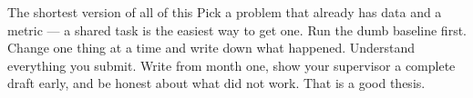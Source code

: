 \documentclass[11pt,a4paper]{article}
\begin{document}
\vspace{0.5cm}
\begin{cbox}{The shortest version of all of this}
Pick a problem that already has data and a metric --- a shared task is the
easiest way to get one. Run the dumb baseline first. Change one thing at a
time and write down what happened. Understand everything you submit. Write
from month one, show your supervisor a complete draft early, and be honest
about what did not work. That is a good thesis.
\end{cbox}
\end{document}
